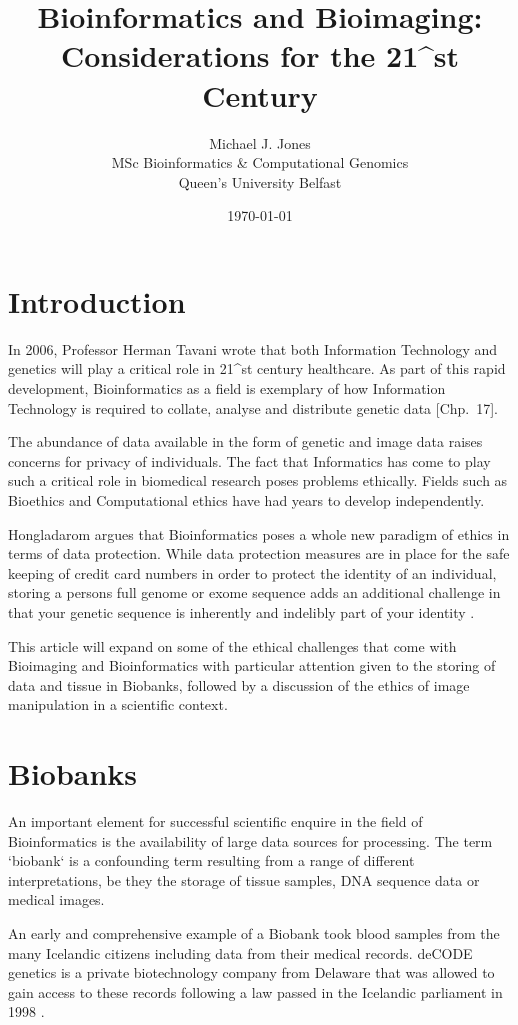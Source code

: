 \documentclass[a4paper, 12pt]{article}
\title{Bioinformatics and Bioimaging: Considerations for the 21^{st} Century}
\author{Michael J. Jones \\
  MSc Bioinformatics \& Computational Genomics \\
  Queen's University Belfast}
\date{\today}
\begin{document}
\section{Introduction}
In 2006, Professor Herman Tavani wrote that both Information Technology and
genetics will play a critical role in 21^{st} century healthcare. As part of
this rapid development, Bioinformatics as a field is exemplary of how
Information Technology is required to collate, analyse and distribute genetic
data \cite{tavani2006ethics}[Chp.~17].

The abundance of data available in the form of genetic and image data raises
concerns for privacy of individuals. The fact that Informatics has come to
play such a critical role in biomedical research poses problems ethically.
Fields such as Bioethics and Computational ethics have had years to develop
independently.

Hongladarom argues that Bioinformatics poses a whole new paradigm of ethics in
terms of data protection. While data protection measures are in place for the
safe keeping of credit card numbers in order to protect the identity of an
individual, storing a persons full genome or exome sequence adds an additional
challenge in that your genetic sequence is inherently and indelibly part of
your identity \cite{hongladarom2006ethics}.

This article will expand on some of the ethical challenges that come with
Bioimaging and Bioinformatics with particular attention given to the storing
of data and tissue in Biobanks, followed by a discussion of the ethics of
image manipulation in a scientific context.

\section{Biobanks}
An important element for successful scientific enquire in the field of
Bioinformatics is the availability of large data sources for processing. The
term `biobank` is a confounding term resulting from a range of different
interpretations, be they the storage of tissue samples, DNA sequence data or
medical images.

An early and comprehensive example of a Biobank took blood samples from the
many Icelandic citizens including data from their medical records. deCODE
genetics is a private biotechnology company from Delaware that was allowed to
gain access to these records following a law passed in the Icelandic parliament
in 1998 \cite{chadwick1999icelandic}.
\end{document}
